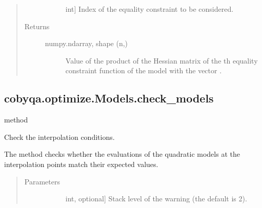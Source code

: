 \documentclass[letterpaper,10pt,english]{sphinxmanual}
\begin{document}
\begin{fulllineitems}
\begin{fulllineitems}
\begin{quote}
\begin{description}
\begin{description}
\item[{}] \leavevmode{[}int{]}
\sphinxAtStartPar
Index of the equality constraint to be considered.

\end{description}

\item[{Returns}] \leavevmode\begin{description}
\item[{numpy.ndarray, shape (n,)}] \leavevmode
\sphinxAtStartPar
Value of the product of the Hessian matrix of the \sphinxhyphen{}th equality
constraint function of the model with the vector .

\end{description}

\end{description}\end{quote}

\end{fulllineitems}



\subsection{cobyqa.optimize.Models.check\_models}
\label{\detokenize{refs/generated/cobyqa.optimize.Models.check_models:cobyqa-optimize-models-check-models}}\label{\detokenize{refs/generated/cobyqa.optimize.Models.check_models::doc}}
\sphinxAtStartPar
method

\begin{fulllineitems}
\label{\detokenize{refs/generated/cobyqa.optimize.Models.check_models:cobyqa.optimize.Models.check_models}}
\sphinxAtStartPar
Check the interpolation conditions.

\sphinxAtStartPar
The method checks whether the evaluations of the quadratic models at the
interpolation points match their expected values.
\begin{quote}\begin{description}
\item[{Parameters}] \leavevmode\begin{description}
\item[{}] \leavevmode{[}int, optional{]}
\sphinxAtStartPar
Stack level of the warning (the default is 2).


\end{description}
\end{description}
\end{quote}
\end{fulllineitems}
\end{fulllineitems}
\end{document}
